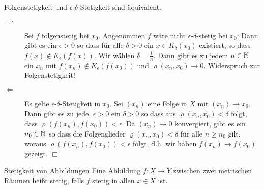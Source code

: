 \begin{multicols}{2}
\begin{center}
	\end{center}
\end{multicols}





\begin{satz}{}
	Folgenstetigkeit und $\epsilon$-$\delta$-Stetigkeit sind äquivalent.
\end{satz}
\beweis
\begin{description}
	\item[\glqq$\Rightarrow$\grqq] Sei $f$ folgenstetig bei $x_0$. Angenommen $f$ wäre nicht $\epsilon$-$\delta$-stetig bei $x_0$:
	Dann gibt es ein $\epsilon>0$ so dass für alle $\delta>0$ ein $x\in K_\delta(x_0)$ existiert, so dass $f(x)\not\in K_\epsilon(f(x))$.
	Wir wählen $\delta=\frac1n$. Dann gibt es zu jedem $n\in\mathbb{N}$ ein $x_n$ mit $f(x_n)\not\in K_\epsilon(f(x_0))$ und $\varrho(x_n,x_0)\to 0$. Widerspruch zur Folgenstetigkeit!
	\item[\glqq$\Leftarrow$\grqq] Es gelte $\epsilon$-$\delta$-Stetigkeit in $x_0$.
	Sei $(x_n)$ eine Folge in $X$ mit $(x_n)\to x_0$.
	Dann gibt es zu jede, $\epsilon>0$ ein $\delta>0$ so dass aus $\varrho(x_n,x_0)<\delta$ folgt, dass $\varrho(f(x_n),f(x_0))<\epsilon$.
	Da $(x_n)\to 0$ konvergiert, gibt es ein $n_0\in\mathbb{N}$ so dass die Folgenglieder $\varrho(x_n,x_0)<\delta$ für alle $n\geq n_0$ gilt, woraus $\varrho(f(x_n),f(x_0))<\epsilon$ folgt, d.h. wir haben $f(x_n)\to f(x_0)$ gezeigt.
	\hfill$\Box$
\end{description}

\begin{definition}{Stetigkeit von Abbildungen}
	Eine Abbildung $f:X\rightarrow Y$ zwischen zwei metrischen Räumen heißt stetig, falls $f$ stetig in allen $x\in X$ ist.
\end{definition}

